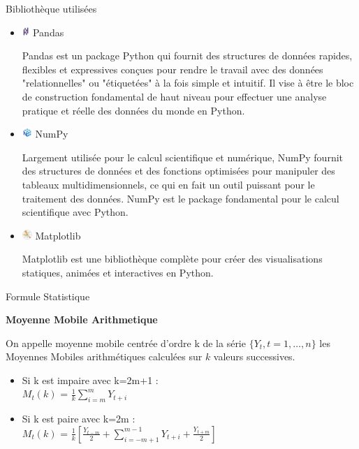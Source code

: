 Bibliothèque utilisées

\begin{itemize}
\item
  \includegraphics[width=\textwidth,height=1em]{icons/pandas-icon.png}
  Pandas

  {Pandas est un package Python qui fournit des structures de données
  rapides, flexibles et expressives conçues pour rendre le travail avec
  des données "relationnelles" ou "étiquetées" à la fois simple et
  intuitif. Il vise à être le bloc de construction fondamental de haut
  niveau pour effectuer une analyse pratique et réelle des données du
  monde en Python.}
\item
  \includegraphics[width=\textwidth,height=1em]{icons/numpy-icon.png}
  NumPy

  {Largement utilisée pour le calcul scientifique et numérique, NumPy
  fournit des structures de données et des fonctions optimisées pour
  manipuler des tableaux multidimensionnels, ce qui en fait un outil
  puissant pour le traitement des données. NumPy est le package
  fondamental pour le calcul scientifique avec Python.}
\item
  \includegraphics[width=\textwidth,height=1em]{icons/matplotlib-icon.png}
  Matplotlib

  {Matplotlib est une bibliothèque complète pour créer des
  visualisations statiques, animées et interactives en Python.}
\end{itemize}

Formule Statistique

\textbf{Moyenne Mobile Arithmetique}

{On appelle moyenne mobile centrée d'ordre k de la série
\(\{Y_t, t=1,\ldots,n\}\) les Moyennes Mobiles arithmétiques calculées
sur \(k\) valeurs successives.}

\begin{itemize}
\item
  Si k est impaire avec k=2m+1 :\\
  {\(M_{t}(k)\) = \(\frac{1}{k}\sum_{i=m}^{m}Y_{t+i}\)}
\item
  Si k est paire avec k=2m :\\
  {\(M_t(k)\) =
  \(\frac{1}{k}\left[\frac{Y_{t-m}}{2}+ \sum_{i=-m+1}^{m-1}Y_{t+i} + \frac{Y_{t+m}}{2}\right]\)
  }\\
\end{itemize}

